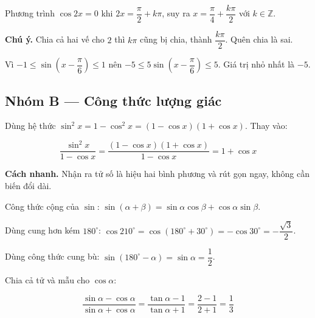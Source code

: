 \documentclass[11pt, a4paper]{article}
\begin{document}
\begin{dapan}[12 — Đáp án D]
Phương trình $\cos 2x = 0$ khi $2x = \dfrac{\pi}{2} + k\pi$, suy ra $x = \dfrac{\pi}{4} + \dfrac{k\pi}{2}$ với $k \in \mathbb{Z}$.

\textbf{Chú ý.} Chia cả hai vế cho $2$ thì $k\pi$ cũng bị chia, thành $\dfrac{k\pi}{2}$. Quên chia là sai.
\end{dapan}

\begin{dapan}[13 — Đáp án D]
Vì $-1 \le \sin\left(x - \dfrac{\pi}{6}\right) \le 1$ nên $-5 \le 5\sin\left(x - \dfrac{\pi}{6}\right) \le 5$. Giá trị nhỏ nhất là $-5$.
\end{dapan}

\subsection*{Nhóm B — Công thức lượng giác}

\begin{dapan}[14 — Đáp án C]
Dùng hệ thức $\sin^2 x = 1 - \cos^2 x = (1 - \cos x)(1 + \cos x)$. Thay vào:

$$\frac{\sin^2 x}{1 - \cos x} = \frac{(1 - \cos x)(1 + \cos x)}{1 - \cos x} = 1 + \cos x$$

\textbf{Cách nhanh.} Nhận ra tử số là hiệu hai bình phương và rút gọn ngay, không cần biến đổi dài.
\end{dapan}

\begin{dapan}[15 — Đáp án D]
Công thức cộng của $\sin$: $\sin(\alpha + \beta) = \sin\alpha\cos\beta + \cos\alpha\sin\beta$.
\end{dapan}

\begin{dapan}[16 — Đáp án D]
Dùng cung hơn kém $180^\circ$: $\cos 210^\circ = \cos(180^\circ + 30^\circ) = -\cos 30^\circ = -\dfrac{\sqrt{3}}{2}$.
\end{dapan}

\begin{dapan}[17 — Đáp án B]
Dùng công thức cung bù: $\sin(180^\circ - \alpha) = \sin\alpha = \dfrac{1}{2}$.
\end{dapan}

\begin{dapan}[18 — Đáp án D]
Chia cả tử và mẫu cho $\cos\alpha$:

$$\frac{\sin\alpha - \cos\alpha}{\sin\alpha + \cos\alpha} = \frac{\tan\alpha - 1}{\tan\alpha + 1} = \frac{2 - 1}{2 + 1} = \frac{1}{3}$$
\end{dapan}
\end{document}
